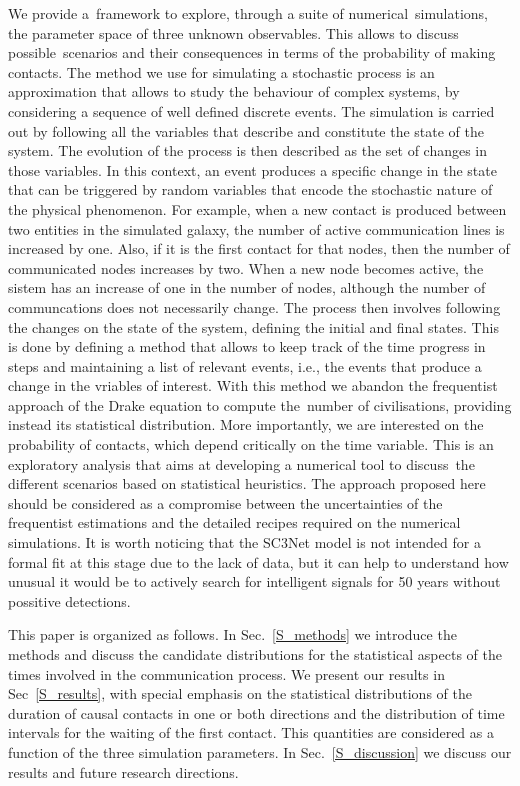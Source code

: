 \documentclass[crop]{CSLB}
\begin{document}
We provide a framework to explore, through a suite of numerical simulations,
the parameter space of three unknown observables.
%
This allows to discuss possible scenarios and their consequences in terms of
the probability of making contacts.
%
The method we use for simulating a stochastic process is an approximation that
allows to study the behaviour of complex systems, by considering a sequence of
well defined discrete events.
%
The simulation is carried out by following all the variables that describe and
constitute the state of the system.
%
The evolution of the process is then
described as the set of changes in those variables. 
%
In this context, an event produces a specific change in the state that can be
triggered by random variables that encode the stochastic nature of the physical
phenomenon.
%
For example, when a new contact is produced between two entities in the
simulated galaxy, the number of active communication lines is increased by one.
%
Also, if it is the first contact for that nodes, 
then the number of communicated nodes increases by two.
%
When a new node becomes active, the sistem has an increase of one
in the number of nodes, although the number of communcations does not
necessarily change.
%
The process then involves following the changes on the state of the system, defining
the initial and final states.
%
This is done by defining a method that allows to keep track of the time
progress in steps and maintaining a list of relevant events, i.e., the events
that produce a change in the vriables of interest.
%
With this method we abandon the frequentist approach of the Drake equation to
compute the number of civilisations, providing instead its statistical
distribution.
%
More importantly, we are interested on the probability of contacts, which
depend critically on the time variable.
%
This is an exploratory analysis that aims at developing a numerical tool to
discuss the different scenarios based on statistical heuristics.
%
The approach proposed here should be considered as a compromise between the
uncertainties of the frequentist estimations and the detailed recipes required
on the numerical simulations.
%
It is worth noticing that the SC3Net model is not intended for a formal fit at this
stage due to the lack of data, but it can help to understand how unusual it
would be to actively search for intelligent signals for 50 years without
possitive detections.


This paper is organized as follows.
%
In Sec.~\ref{S_methods} we introduce the methods and discuss the candidate
distributions for the statistical aspects of the times involved in the
communication process.
%
We present our results in Sec~\ref{S_results}, with special emphasis on the
statistical distributions of the duration of causal contacts in one or both
directions and the distribution of time intervals for the waiting of the first
contact.
%
This quantities are considered as a function of the three simulation
parameters.
%
In Sec.~\ref{S_discussion} we discuss our results and future research
directions.   
\end{document}

